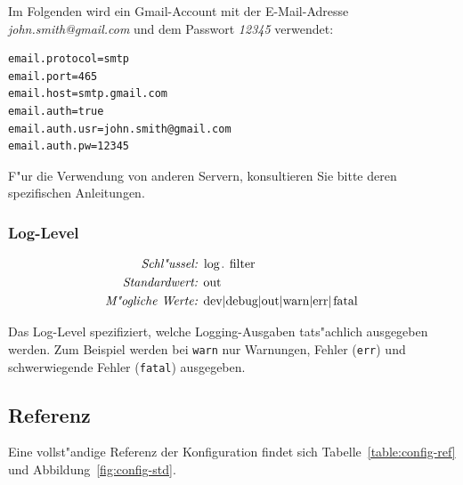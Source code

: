     Im Folgenden wird ein Gmail-Account mit der
    E-Mail-Adresse \emph{john.smith@gmail.com} und
    dem Passwort \emph{12345} verwendet:

    \begin{lstlisting}[]%@formatter:off
email.protocol=smtp
email.port=465
email.host=smtp.gmail.com
email.auth=true
email.auth.usr=john.smith@gmail.com
email.auth.pw=12345
    \end{lstlisting}%

    F"ur die Verwendung von anderen Servern, konsultieren Sie
    bitte deren spezifischen Anleitungen.

    \subsubsection{Log-Level}

    \begin{align*}
        \emph{Schl"ussel: } & \lstinline{log.filter}\\
        \emph{Standardwert: } & \lstinline{out}\\
        \emph{M"ogliche Werte: } & \lstinline{dev|debug|out|warn|err|fatal}
    \end{align*}

    Das Log-Level spezifiziert, welche Logging-Ausgaben tats"achlich
    ausgegeben werden. Zum Beispiel werden bei \lstinline{warn}
    nur Warnungen, Fehler (\lstinline{err}) und schwerwiegende Fehler
    (\lstinline{fatal}) ausgegeben.

    \subsection{Referenz}

    Eine vollst"andige Referenz der Konfiguration
    findet sich Tabelle~\ref{table:config-ref}
    und Abbildung~\ref{fig:config-std}.

